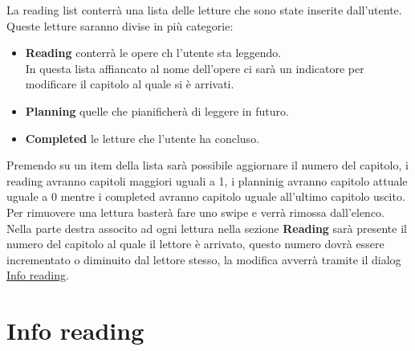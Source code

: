 \documentclass{report}
\begin{document}
La reading list conterrà una lista delle letture che sono state inserite dall'utente.\\
Queste letture saranno divise in più categorie:
\begin{itemize}
   \item \textbf{Reading} conterrà le opere ch l'utente sta leggendo.\\
   In questa lista affiancato al nome dell'opere ci sarà un indicatore per modificare il capitolo al quale si è arrivati.
   \item \textbf{Planning} quelle che pianificherà di leggere in futuro.
   \item \textbf{Completed} le letture che l'utente ha concluso.
\end{itemize}
Premendo su un item della lista sarà possibile aggiornare il numero del capitolo, i reading avranno capitoli maggiori uguali a 1, i planninig avranno capitolo attuale uguale a 0 mentre i completed avranno capitolo uguale all'ultimo capitolo uscito.\\
Per rimuovere una lettura basterà fare uno swipe e verrà rimossa dall'elenco.\\
Nella parte destra associto ad ogni lettura nella sezione \textbf{Reading} sarà presente il numero del capitolo al quale il lettore è arrivato, questo numero dovrà essere incrementato o diminuito dal lettore stesso, la modifica avverrà tramite il dialog \hyperref[sec:info_reading]{Info reading}.

\section{Info reading}
\label{sec:info_reading}
\end{document}
